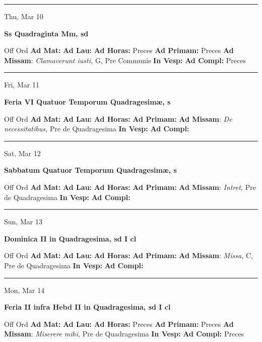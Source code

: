 \documentclass[letterpaper, 10pt]{article}
\begin{document}
\hrule
\begin{center}
Thu, Mar 10
\end{center}\textbf{ \large Ss Quadraginta Mm, \textnormal{\normalsize sd}}
\begin{justify}
Off Ord
\textbf{Ad Mat: }
\textbf{Ad Lau: }
\textbf{Ad Horas: }Preces
\textbf{Ad Primam: }Preces
\textbf{Ad Missam}: \textit{Clamaverunt iusti,} G, Pre Communis
\textbf{In Vesp: }
\textbf{Ad Compl: }Preces\end{justify}



\hrule
\begin{center}
Fri, Mar 11
\end{center}\textbf{ \large Feria VI Quatuor Temporum Quadragesimæ, \textnormal{\normalsize s}}
\begin{justify}
Off Ord
\textbf{Ad Mat: }
\textbf{Ad Lau: }
\textbf{Ad Horas: }
\textbf{Ad Primam: }
\textbf{Ad Missam}: \textit{De necessitatibus,} Pre de Quadragesima
\textbf{In Vesp: }
\textbf{Ad Compl: }\end{justify}



\hrule
\begin{center}
Sat, Mar 12
\end{center}\textbf{ \large Sabbatum Quatuor Temporum Quadragesimæ, \textnormal{\normalsize s}}
\begin{justify}
Off Ord
\textbf{Ad Mat: }
\textbf{Ad Lau: }
\textbf{Ad Horas: }
\textbf{Ad Primam: }
\textbf{Ad Missam}: \textit{Intret,} Pre de Quadragesima
\textbf{In Vesp: }
\textbf{Ad Compl: }\end{justify}



\hrule
\begin{center}
Sun, Mar 13
\end{center}\textbf{ \large Dominica II in Quadragesima, \textnormal{\normalsize sd I cl}}
\begin{justify}
Off Ord
\textbf{Ad Mat: }
\textbf{Ad Lau: }
\textbf{Ad Horas: }
\textbf{Ad Primam: }
\textbf{Ad Missam}: \textit{Missa,} C, Pre de Quadragesima
\textbf{In Vesp: }
\textbf{Ad Compl: }\end{justify}



\hrule
\begin{center}
Mon, Mar 14
\end{center}\textbf{ \large Feria II infra Hebd II in Quadragesima, \textnormal{\normalsize sd I cl}}
\begin{justify}
Off Ord
\textbf{Ad Mat: }
\textbf{Ad Lau: }
\textbf{Ad Horas: }Preces
\textbf{Ad Primam: }Preces
\textbf{Ad Missam}: \textit{Miserere mihi,} Pre de Quadragesima
\textbf{In Vesp: }
\textbf{Ad Compl: }Preces\end{justify}
\end{document}
